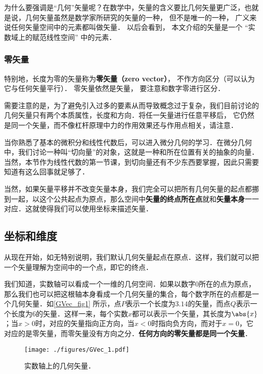 为什么要强调是“几何”矢量呢？在数学中，矢量的含义要比几何矢量更广泛，也就是说，几何矢量虽然是数学家所研究的矢量的一种， 但不是唯一的一种， 广义来说任何矢量空间中的元素都叫做矢量． 以后会看到， 本文介绍的矢量是一个 “实数域上的赋范线性空间” 中的元素．

\subsubsection{零矢量}
特别地，长度为零的矢量称为\textbf{零矢量（zero vector）}， 不作方向区分（可以认为它与任何矢量平行）． 零矢量依然是矢量， 要注意和数字零进行区分．

需要注意的是，为了避免引入过多的要素从而导致概念过于复杂，我们目前讨论的几何矢量只有两个本质属性，长度和方向．将任一矢量进行任意平移后， 它仍然是同一个矢量，而不像杠杆原理中力的作用效果还与作用点相关，请注意．

当你熟悉了基本的微积分和线性代数后，可以进入微分几何的学习．在微分几何中，我们讨论一种叫“切向量”的对象，这就是一种和所在位置有关的抽象的向量．当然，本节作为线性代数的第一节课，到切向量还有不少东西要掌握，因此只需要知道有这么回事就足够了．

当然，如果矢量平移并不改变矢量本身，我们完全可以把所有几何矢量的起点都挪到一起，以这个公共起点为原点，那么空间中\textbf{矢量的终点所在点}就和\textbf{矢量本身}一一对应．这就使得我们可以使用坐标来描述矢量．


\subsection{坐标和维度}

从现在开始，如无特别说明，我们默认几何矢量起点在原点．这样，我们就可以把一个矢量理解为空间中的一个点，即它的终点．

我们知道，实数轴可以看成一个一维的几何空间．如果以数字$0$所在的点为原点，那么我们也可以把这根轴本身看成一个几何矢量的集合，每个数字所在的点都是一个几何矢量．如\autoref{GVec_fig1} 所示，点$P$表示一个长度为$3.14$的矢量，而点$Q$表示一个长度为$6$的矢量．这样一来，每个实数$x$都可以表示一个矢量，其长度为$\abs{x}$；当$x>0$时，对应的矢量指向正方向，当$x<0$时指向负方向，而对于$x=0$，它对应的是零矢量，而零矢量没有方向之分．\textbf{任何方向的零矢量都是同一个矢量}．

\begin{figure}[ht]
\centering
\texttt{[image: ./figures/GVec\_1.pdf]}
\caption{实数轴上的几何矢量．} \label{GVec_fig1}
\end{figure}


